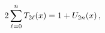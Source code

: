 \[2\sum_{\ell=0}^{n}\mathop{T_{2\ell}\/}\nolimits\!\left(x\right)=1+\mathop{U_{2%
n}\/}\nolimits\!\left(x\right),\]
